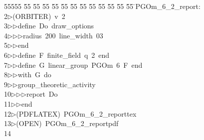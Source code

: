 %
%
\begin{tabbing}
55555 \= 55 \= 55 \= 55 \= 55 \= 55 \= 55 \= 55 \= 55 \= 55 \= 55 \= 55 \= 55 \= \>PGOm\_6\_2\_report:\\[0pt]
2\>$\triangleright$\>(ORBITER)\ v\ 2\ \\[0pt]
3\>$\triangleright$\>$\triangleright$\>define\ Do\ draw\_options\ \\[0pt]
4\>$\triangleright$\>$\triangleright$\>$\triangleright$\>radius\ 200\ line\_width\ 03\ \\[0pt]
5\>$\triangleright$\>$\triangleright$\>end\ \\[0pt]
6\>$\triangleright$\>$\triangleright$\>define\ F\ finite\_field\ q\ 2\ end\ \\[0pt]
7\>$\triangleright$\>$\triangleright$\>define\ G\ linear\_group\ PGOm\ 6\ F\ end\ \\[0pt]
8\>$\triangleright$\>$\triangleright$\>with\ G\ do\ \\[0pt]
9\>$\triangleright$\>$\triangleright$\>group\_theoretic\_activity\ \\[0pt]
10\>$\triangleright$\>$\triangleright$\>$\triangleright$\>report\ Do\ \\[0pt]
11\>$\triangleright$\>$\triangleright$\>end\\[0pt]
12\>$\triangleright$\>(PDFLATEX)\ PGOm\_6\_2\_reporttex\\[0pt]
13\>$\triangleright$\>(OPEN)\ PGOm\_6\_2\_reportpdf\\[0pt]
14\>\end{tabbing}
